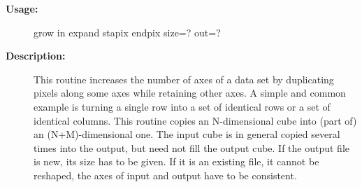 \begin{description}
\begin{description}
\item [\textbf{Usage:}]

   grow in expand stapix endpix size=? out=?


\item [\textbf{Description:}]

   This routine increases the number of axes of a data set by
   duplicating pixels along some axes while retaining other axes.
   A simple and common example is turning a single row into a set of
   identical rows or a set of identical columns. This routine copies
   an N-dimensional cube into (part of) an (N+M)-dimensional one. The
   input cube is in general copied several times into the output, but
   need not fill the output cube. If the output file is new, its size
   has to be given. If it is an existing file, it cannot be reshaped,
   the axes of input and output have to be consistent.


\end{description}
\end{description}
